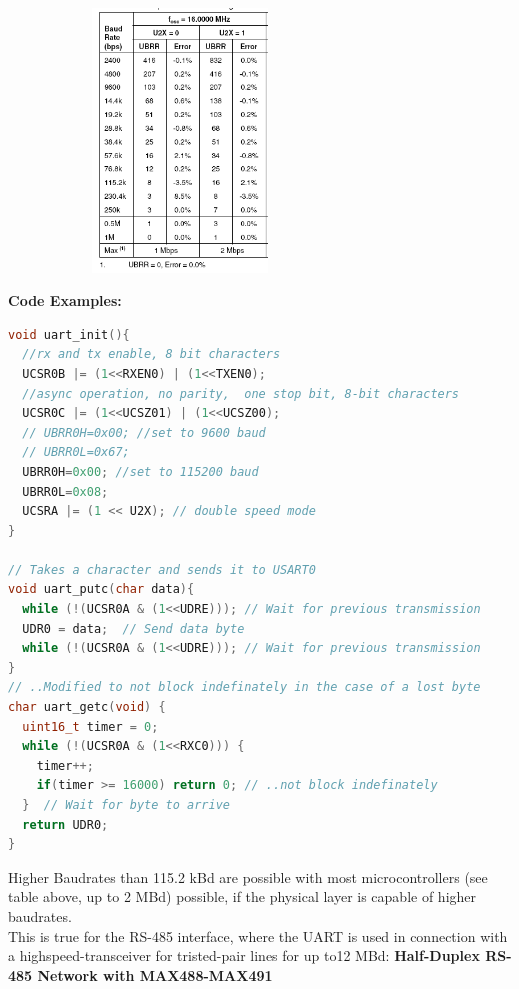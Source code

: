     \begin{figure}[h]
    \centering
    \includegraphics[width=7cm, height=7cm]{Images/image47.png}
    \label{fig:Fig 144}
    \end{figure}
\newpage
\textbf{Code Examples:}
\begin{lstlisting}[style=mystyle, language=c]
void uart_init(){
  //rx and tx enable, 8 bit characters
  UCSR0B |= (1<<RXEN0) | (1<<TXEN0);
  //async operation, no parity,  one stop bit, 8-bit characters
  UCSR0C |= (1<<UCSZ01) | (1<<UCSZ00);
  // UBRR0H=0x00; //set to 9600 baud
  // UBRR0L=0x67;
  UBRR0H=0x00; //set to 115200 baud
  UBRR0L=0x08;
  UCSRA |= (1 << U2X); // double speed mode
}

// Takes a character and sends it to USART0
void uart_putc(char data){
  while (!(UCSR0A & (1<<UDRE))); // Wait for previous transmission
  UDR0 = data;  // Send data byte
  while (!(UCSR0A & (1<<UDRE))); // Wait for previous transmission
}
// ..Modified to not block indefinately in the case of a lost byte
char uart_getc(void) {
  uint16_t timer = 0;
  while (!(UCSR0A & (1<<RXC0))) {
    timer++;
    if(timer >= 16000) return 0; // ..not block indefinately
  }  // Wait for byte to arrive
  return UDR0;
}
\end{lstlisting}

Higher Baudrates than 115.2 kBd are possible with most microcontrollers (see table above, up to 2 MBd) possible, if the physical layer is capable of higher baudrates. \\

This is true for the RS-485 interface, where the UART is used in connection with a highspeed-transceiver for tristed-pair lines for up to12 MBd:
\newpage
{\rot\bf Half-Duplex RS-485 Network with MAX488-MAX491}\\

